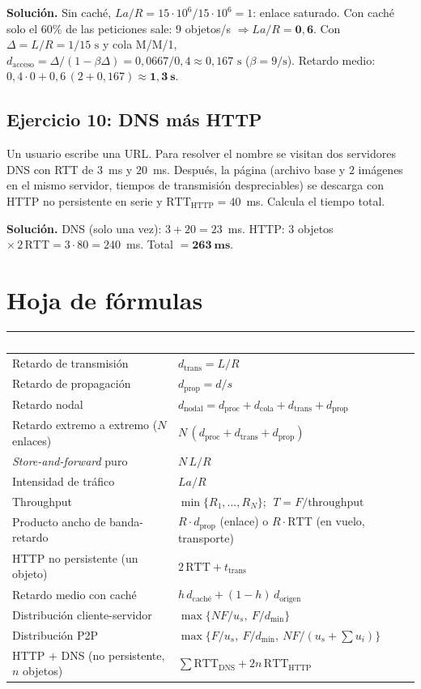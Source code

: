 \documentclass[11pt,a4paper]{article}
\newcommand{\hd}[1]{\cellcolor{uahblue}\textcolor{white}{\textbf{#1}}}
\begin{document}
\textbf{Solución.} Sin caché, $La/R=15\cdot10^{6}/15\cdot10^{6}=1$: enlace saturado. Con caché solo el $60\%$ de las peticiones sale: $9$ objetos/s $\Rightarrow La/R=\mathbf{0{,}6}$. Con $\Delta=L/R=1/15\text{ s}$ y cola M/M/1, $d_{\text{acceso}}=\Delta/(1-\beta\Delta)=0{,}0667/0{,}4\approx0{,}167\text{ s}$ ($\beta=9\text{/s}$).
Retardo medio: $0{,}4\cdot0+0{,}6\,(2+0{,}167)\approx\mathbf{1{,}3~s}$.

\subsection*{Ejercicio 10: DNS más HTTP}
Un usuario escribe una URL. Para resolver el nombre se visitan dos servidores DNS con RTT de $3$~ms y $20$~ms. Después, la página (archivo base y $2$ imágenes en el mismo servidor, tiempos de transmisión despreciables) se descarga con HTTP no persistente en serie y $\text{RTT}_{\text{HTTP}}=40$~ms. Calcula el tiempo total.

\textbf{Solución.} DNS (solo una vez): $3+20=23$~ms. HTTP: $3$ objetos $\times\,2\,\text{RTT}=3\cdot80=240$~ms. Total $=\mathbf{263~ms}$.

\newpage
\section{Hoja de fórmulas}

\begin{tabularx}{\textwidth}{@{}L{5.6cm}X@{}}
\toprule
\hd{Concepto} & \hd{Fórmula} \\
\midrule
Retardo de transmisión & $d_{\text{trans}}=L/R$ \\
Retardo de propagación & $d_{\text{prop}}=d/s$ \\
Retardo nodal & $d_{\text{nodal}}=d_{\text{proc}}+d_{\text{cola}}+d_{\text{trans}}+d_{\text{prop}}$ \\
Retardo extremo a extremo ($N$ enlaces) & $N\,(d_{\text{proc}}+d_{\text{trans}}+d_{\text{prop}})$ \\
\textit{Store-and-forward} puro & $N\,L/R$ \\
Intensidad de tráfico & $La/R$ \\
Throughput & $\min\{R_1,\dots,R_N\}$; $\;T=F/\text{throughput}$ \\
Producto ancho de banda-retardo & $R\cdot d_{\text{prop}}$ (enlace) o $R\cdot\text{RTT}$ (en vuelo, transporte) \\
HTTP no persistente (un objeto) & $2\,\text{RTT}+t_{\text{trans}}$ \\
Retardo medio con caché & $h\,d_{\text{caché}}+(1-h)\,d_{\text{origen}}$ \\
Distribución cliente-servidor & $\max\{NF/u_s,\ F/d_{\min}\}$ \\
Distribución P2P & $\max\{F/u_s,\ F/d_{\min},\ NF/(u_s+\sum u_i)\}$ \\
HTTP + DNS (no persistente, $n$ objetos) & $\sum \text{RTT}_{\text{DNS}}+2n\,\text{RTT}_{\text{HTTP}}$ \\
\bottomrule
\end{tabularx}
\end{document}
